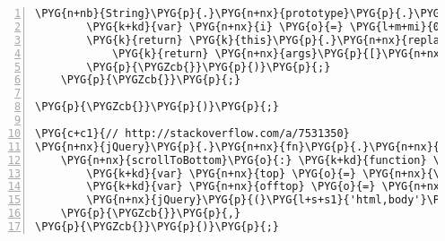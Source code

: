 \begin{Verbatim}[commandchars=\\\{\},numbers=left,firstnumber=1,stepnumber=5]
    \PYG{n+nb}{String}\PYG{p}{.}\PYG{n+nx}{prototype}\PYG{p}{.}\PYG{n+nx}{format} \PYG{o}{=} \PYG{k+kd}{function}\PYG{p}{(}\PYG{p}{)} \PYG{p}{\PYGZob{}}
        \PYG{k+kd}{var} \PYG{n+nx}{i} \PYG{o}{=} \PYG{l+m+mi}{0}\PYG{p}{;} \PYG{n+nx}{args} \PYG{o}{=} \PYG{n+nx}{arguments}\PYG{p}{;}
        \PYG{k}{return} \PYG{k}{this}\PYG{p}{.}\PYG{n+nx}{replace}\PYG{p}{(}\PYG{l+s+sr}{/\PYGZob{}\PYGZcb{}/g}\PYG{p}{,} \PYG{k+kd}{function}\PYG{p}{(}\PYG{p}{)} \PYG{p}{\PYGZob{}}
            \PYG{k}{return} \PYG{n+nx}{args}\PYG{p}{[}\PYG{n+nx}{i}\PYG{o}{++}\PYG{p}{]}\PYG{p}{;}
        \PYG{p}{\PYGZcb{}}\PYG{p}{)}\PYG{p}{;}
    \PYG{p}{\PYGZcb{}}\PYG{p}{;}

\PYG{p}{\PYGZcb{}}\PYG{p}{)}\PYG{p}{;}

\PYG{c+c1}{// http://stackoverflow.com/a/7531350}
\PYG{n+nx}{jQuery}\PYG{p}{.}\PYG{n+nx}{fn}\PYG{p}{.}\PYG{n+nx}{extend}\PYG{p}{(}\PYG{p}{\PYGZob{}}
    \PYG{n+nx}{scrollToBottom}\PYG{o}{:} \PYG{k+kd}{function} \PYG{p}{(}\PYG{p}{)} \PYG{p}{\PYGZob{}}
        \PYG{k+kd}{var} \PYG{n+nx}{top} \PYG{o}{=} \PYG{n+nx}{\PYGZdl{}}\PYG{p}{(}\PYG{k}{this}\PYG{p}{)}\PYG{p}{.}\PYG{n+nx}{offset}\PYG{p}{(}\PYG{p}{)}\PYG{p}{.}\PYG{n+nx}{top}\PYG{p}{;}
        \PYG{k+kd}{var} \PYG{n+nx}{offtop} \PYG{o}{=} \PYG{n+nx}{top} \PYG{o}{-} \PYG{l+m+mi}{250} \PYG{o}{+} \PYG{n+nx}{\PYGZdl{}}\PYG{p}{(}\PYG{k}{this}\PYG{p}{)}\PYG{p}{.}\PYG{n+nx}{height}\PYG{p}{(}\PYG{p}{)}\PYG{p}{;}
        \PYG{n+nx}{jQuery}\PYG{p}{(}\PYG{l+s+s1}{'html,body'}\PYG{p}{)}\PYG{p}{.}\PYG{n+nx}{animate}\PYG{p}{(}\PYG{p}{\PYGZob{}}\PYG{n+nx}{scrollTop}\PYG{o}{:} \PYG{n+nx}{offtop}\PYG{p}{\PYGZcb{}}\PYG{p}{,} \PYG{l+m+mi}{100}\PYG{p}{)}\PYG{p}{;}
    \PYG{p}{\PYGZcb{}}\PYG{p}{,}
\PYG{p}{\PYGZcb{}}\PYG{p}{)}\PYG{p}{;}
\end{Verbatim}


